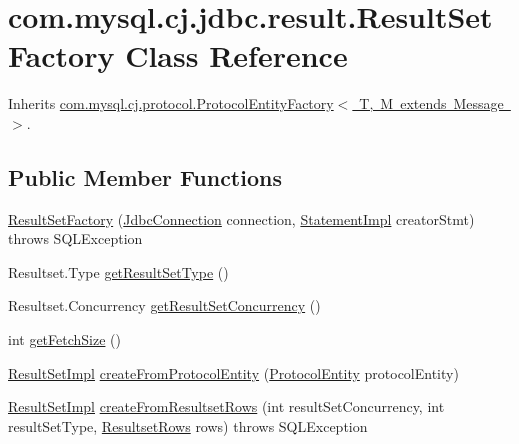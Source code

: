 \hypertarget{classcom_1_1mysql_1_1cj_1_1jdbc_1_1result_1_1_result_set_factory}{}\section{com.\+mysql.\+cj.\+jdbc.\+result.\+Result\+Set\+Factory Class Reference}
\label{classcom_1_1mysql_1_1cj_1_1jdbc_1_1result_1_1_result_set_factory}


Inherits \mbox{\hyperlink{interfacecom_1_1mysql_1_1cj_1_1protocol_1_1_protocol_entity_factory}{com.\+mysql.\+cj.\+protocol.\+Protocol\+Entity\+Factory$<$ T, M extends Message $>$}}.

\subsection*{Public Member Functions}
\begin{DoxyCompactItemize}
\item 
\mbox{\hyperlink{classcom_1_1mysql_1_1cj_1_1jdbc_1_1result_1_1_result_set_factory_aa9098e8cd6c53ba10c3de594a9b600d0}{Result\+Set\+Factory}} (\mbox{\hyperlink{interfacecom_1_1mysql_1_1cj_1_1jdbc_1_1_jdbc_connection}{Jdbc\+Connection}} connection, \mbox{\hyperlink{classcom_1_1mysql_1_1cj_1_1jdbc_1_1_statement_impl}{Statement\+Impl}} creator\+Stmt)  throws S\+Q\+L\+Exception 
\item 
Resultset.\+Type \mbox{\hyperlink{classcom_1_1mysql_1_1cj_1_1jdbc_1_1result_1_1_result_set_factory_a09f8de6edd7696e5095a1b04ae26c573}{get\+Result\+Set\+Type}} ()
\item 
Resultset.\+Concurrency \mbox{\hyperlink{classcom_1_1mysql_1_1cj_1_1jdbc_1_1result_1_1_result_set_factory_aec51b1445e56580f9cdaba1427d8b861}{get\+Result\+Set\+Concurrency}} ()
\item 
int \mbox{\hyperlink{classcom_1_1mysql_1_1cj_1_1jdbc_1_1result_1_1_result_set_factory_ab49f2c0b4d9ce728f023c3af158cffd9}{get\+Fetch\+Size}} ()
\item 
\mbox{\hyperlink{classcom_1_1mysql_1_1cj_1_1jdbc_1_1result_1_1_result_set_impl}{Result\+Set\+Impl}} \mbox{\hyperlink{classcom_1_1mysql_1_1cj_1_1jdbc_1_1result_1_1_result_set_factory_a5638ebeb2a785cacf994cadafbfbaac7}{create\+From\+Protocol\+Entity}} (\mbox{\hyperlink{interfacecom_1_1mysql_1_1cj_1_1protocol_1_1_protocol_entity}{Protocol\+Entity}} protocol\+Entity)
\item 
\mbox{\hyperlink{classcom_1_1mysql_1_1cj_1_1jdbc_1_1result_1_1_result_set_impl}{Result\+Set\+Impl}} \mbox{\hyperlink{classcom_1_1mysql_1_1cj_1_1jdbc_1_1result_1_1_result_set_factory_a30cd3345dd9bdba80ee0ab3f3708da57}{create\+From\+Resultset\+Rows}} (int result\+Set\+Concurrency, int result\+Set\+Type, \mbox{\hyperlink{interfacecom_1_1mysql_1_1cj_1_1protocol_1_1_resultset_rows}{Resultset\+Rows}} rows)  throws S\+Q\+L\+Exception 
\end{DoxyCompactItemize}



